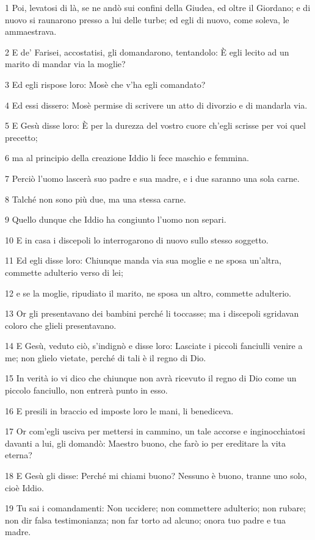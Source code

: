 \par 1 Poi, levatosi di là, se ne andò sui confini della Giudea, ed oltre il Giordano; e di nuovo si raunarono presso a lui delle turbe; ed egli di nuovo, come soleva, le ammaestrava.
\par 2 E de' Farisei, accostatisi, gli domandarono, tentandolo: È egli lecito ad un marito di mandar via la moglie?
\par 3 Ed egli rispose loro: Mosè che v'ha egli comandato?
\par 4 Ed essi dissero: Mosè permise di scrivere un atto di divorzio e di mandarla via.
\par 5 E Gesù disse loro: È per la durezza del vostro cuore ch'egli scrisse per voi quel precetto;
\par 6 ma al principio della creazione Iddio li fece maschio e femmina.
\par 7 Perciò l'uomo lascerà suo padre e sua madre, e i due saranno una sola carne.
\par 8 Talché non sono più due, ma una stessa carne.
\par 9 Quello dunque che Iddio ha congiunto l'uomo non separi.
\par 10 E in casa i discepoli lo interrogarono di nuovo sullo stesso soggetto.
\par 11 Ed egli disse loro: Chiunque manda via sua moglie e ne sposa un'altra, commette adulterio verso di lei;
\par 12 e se la moglie, ripudiato il marito, ne sposa un altro, commette adulterio.
\par 13 Or gli presentavano dei bambini perché li toccasse; ma i discepoli sgridavan coloro che glieli presentavano.
\par 14 E Gesù, veduto ciò, s'indignò e disse loro: Lasciate i piccoli fanciulli venire a me; non glielo vietate, perché di tali è il regno di Dio.
\par 15 In verità io vi dico che chiunque non avrà ricevuto il regno di Dio come un piccolo fanciullo, non entrerà punto in esso.
\par 16 E presili in braccio ed imposte loro le mani, li benediceva.
\par 17 Or com'egli usciva per mettersi in cammino, un tale accorse e inginocchiatosi davanti a lui, gli domandò: Maestro buono, che farò io per ereditare la vita eterna?
\par 18 E Gesù gli disse: Perché mi chiami buono? Nessuno è buono, tranne uno solo, cioè Iddio.
\par 19 Tu sai i comandamenti: Non uccidere; non commettere adulterio; non rubare; non dir falsa testimonianza; non far torto ad alcuno; onora tuo padre e tua madre.
